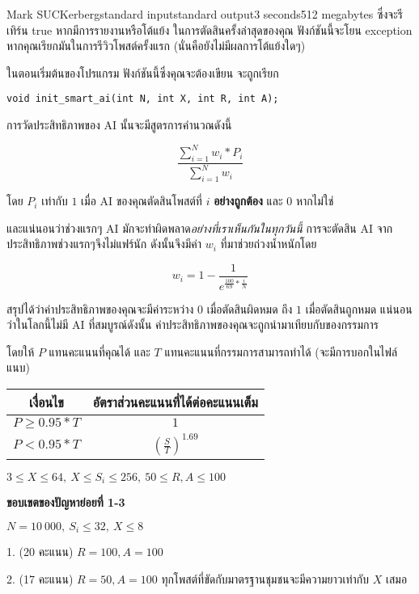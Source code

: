 \documentclass[11pt,a4paper]{article}
\begin{document}
\begin{problem}{Mark SUCKerberg}{standard input}{standard output}{3 seconds}{512 megabytes}
ซึ่งจะรีเทิร์น true หากมีการรายงานหรือโต้แย้ง ในการตัดสินครั้งล่าสุดของคุณ
ฟังก์ชันนี้จะโยน exception หากคุณเรียกมันในการรีวิวโพสต์ครั้งแรก (นั่นคือยังไม่มีผลการโต้แย้งใดๆ)

ในตอนเริ่มต้นของโปรแกรม ฟังก์ชันนี้ซึ่งคุณจะต้องเขียน จะถูกเรียก

\begin{verbatim}
void init_smart_ai(int N, int X, int R, int A);
\end{verbatim}

\Scoring

การวัดประสิทธิภาพของ AI นั้นจะมีสูตรการคำนวณดังนี้

\[\frac{\sum_{i=1}^{N} w_i * P_i}{\sum_{i=1}^{N} w_i}\]

โดย $P_i$ เท่ากับ $1$ เมื่อ AI ของคุณตัดสินโพสต์ที่ $i$ \textbf{อย่างถูกต้อง} และ $0$ หากไม่ใช่

และแน่นอนว่าช่วงแรกๆ AI มักจะทำผิดพลาด\textit{อย่างที่เราเห็นกันในทุกวันนี้} การจะตัดสิน AI จาก
ประสิทธิภาพช่วงแรกๆจึงไม่แฟร์นัก ดังนั้นจึงมีค่า $w_i$ ที่มาช่วยถ่วงน้ำหนักโดย

\[w_i = 1 - \frac{1}{e^{\frac{100}{69}*\frac{i}{N}}}\]

สรุปได้ว่าค่าประสิทธิภาพของคุณจะมีค่าระหว่าง $0$ เมื่อตัดสินผิดหมด ถึง $1$ เมื่อตัดสินถูกหมด
แน่นอนว่าในโลกนี้ไม่มี AI ที่สมบูรณ์ดังนั้น ค่าประสิทธิภาพของคุณจะถูกนำมาเทียบกับของกรรมการ

โดยให้ $P$ แทนคะแนนที่คุณได้ และ $T$ แทนคะแนนที่กรรมการสามารถทำได้ (จะมีการบอกในไฟล์แนบ)

\begin{center}
\begin{tabular}{ | c | c | }
\hline
\textbf{เงื่อนไข} & \textbf{อัตราส่วนคะแนนที่ได้ต่อคะแนนเต็ม} \\
\hline
$P \ge 0.95 * T$ & $1$ \\
\hline
$P < 0.95 * T$ & $(\frac{S}{T})^{1.69}$ \\
\hline
\end{tabular}
\end{center}

\Subtasks

$3 \le X \le 64,\ X \le S_i \le 256,\ 50 \le R, A \le 100$

\textbf{ขอบเขตของปัญหาย่อยที่ 1-3}

$N = 10\ 000,\ S_i \le 32,\ X \le 8$

1. (20 คะแนน) $R = 100, A = 100$

2. (17 คะแนน) $R = 50, A = 100$ ทุกโพสต์ที่ขัดกับมาตรฐานชุมชนจะมีความยาวเท่ากับ $X$ เสมอ


\end{problem}
\end{document}
